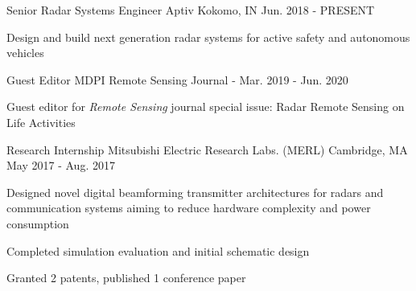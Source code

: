 
\begin{cventries}

    \cventry
        {Senior Radar Systems Engineer}
        {Aptiv}
        {Kokomo, IN}
        {Jun. 2018 - PRESENT}
        {
            \begin{cvitems}
                \item {Design and build next generation radar systems for active safety and autonomous vehicles}
            \end{cvitems}
        }
        
    \cventry
        {Guest Editor}
        {MDPI Remote Sensing Journal}
        {-}
        {Mar. 2019 - Jun. 2020}
        {
            \begin{cvitems}
                \item {Guest editor for {\em{Remote Sensing}} journal special issue: Radar Remote Sensing on Life Activities}
            \end{cvitems}
        }

    \cventry
        {Research Internship}
        {Mitsubishi Electric Research Labs. (MERL)}
        {Cambridge, MA}
        {May 2017 - Aug. 2017}
        {
            \begin{cvitems}
                \item {Designed novel digital beamforming transmitter architectures for radars and communication systems aiming to reduce hardware complexity and power consumption}
                \item {Completed simulation evaluation and initial schematic design}
                \item {Granted 2 patents, published 1 conference paper}
            \end{cvitems}
        }

\end{cventries}

